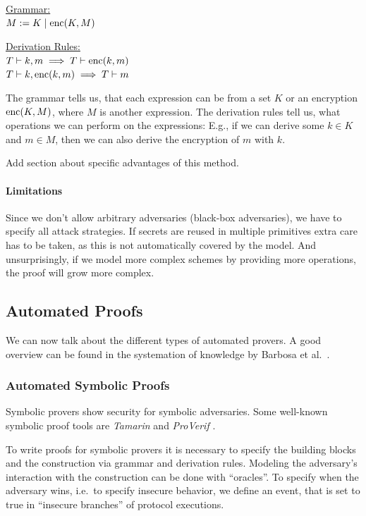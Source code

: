 \noindent\begin{minipage}[t]{.5\linewidth}
    \underline{Grammar:}\\
    $M:= K\mid\mathrm{enc}(K, M)$
\end{minipage}\hfill
\begin{minipage}[t]{.5\linewidth}
    \underline{Derivation Rules:}\\
    $T\vdash k, m\implies T\vdash \mathrm{enc}(k, m)$\\
    $T\vdash k, \mathrm{enc}(k, m)\implies T\vdash m$
\end{minipage} 

The grammar tells us, that each expression can be from a set $K$ or an encryption $\mathrm{enc}(K, M)$, where $M$ is another expression.
The derivation rules tell us, what operations we can perform on the expressions:
E.g., if we can derive some $k\in K$ and $m\in M$, then we can also derive the encryption of $m$ with $k$.

\alert{Add section about specific advantages of this method.}

\paragraph{Limitations}
Since we don't allow arbitrary adversaries (black-box adversaries), we have to specify all attack strategies.
If secrets are reused in multiple primitives extra care has to be taken, as this is not automatically covered by the model.
And unsurprisingly, if we model more complex schemes by providing more operations, the proof will grow more complex.
 
\subsection{Automated Proofs}
We can now talk about the different types of automated provers. A good overview can be found in the systemation of knowledge by Barbosa et al.\ \cite{SP:BBBBCL21}.

\subsubsection{Automated Symbolic Proofs}
Symbolic provers show security for symbolic adversaries. 
Some well-known symbolic proof tools are \emph{Tamarin} \cite{TamarinBook} and \emph{ProVerif} \cite{ProVerifBook}.

To write proofs for symbolic provers it is necessary to specify the building blocks and the construction via grammar and derivation rules.
Modeling the adversary's interaction with the construction can be done with ``oracles''.
To specify when the adversary wins, i.e.\ to specify insecure behavior, we define an event, that is set to true in ``insecure branches'' of protocol executions.


